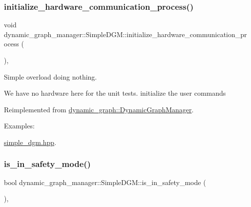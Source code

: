 \subsubsection{\texorpdfstring{initialize\+\_\+hardware\+\_\+communication\+\_\+process()}{initialize\_hardware\_communication\_process()}}
{\footnotesize\ttfamily void dynamic\+\_\+graph\+\_\+manager\+::\+Simple\+D\+G\+M\+::initialize\+\_\+hardware\+\_\+communication\+\_\+process (\begin{DoxyParamCaption}{ }\end{DoxyParamCaption})\hspace{0.3cm}{\ttfamily [inline]}, {\ttfamily [virtual]}}



Simple overload doing nothing. 

We have no hardware here for the unit tests. initialize the user commands 

Reimplemented from \hyperlink{classdynamic__graph_1_1DynamicGraphManager_ae3927887762c52c7bf50ab5a565c3077}{dynamic\+\_\+graph\+::\+Dynamic\+Graph\+Manager}.

\begin{Desc}
\item[Examples\+: ]\par
\hyperlink{simple_dgm_8hpp-example}{simple\+\_\+dgm.\+hpp}.\end{Desc}
\mbox{\label{classdynamic__graph__manager_1_1SimpleDGM_a5fe81f9feb5d982761d7a427aa31e7b4}} 
\subsubsection{\texorpdfstring{is\+\_\+in\+\_\+safety\+\_\+mode()}{is\_in\_safety\_mode()}}
{\footnotesize\ttfamily bool dynamic\+\_\+graph\+\_\+manager\+::\+Simple\+D\+G\+M\+::is\+\_\+in\+\_\+safety\+\_\+mode (\begin{DoxyParamCaption}{ }\end{DoxyParamCaption})\hspace{0.3cm}{\ttfamily [inline]}, {\ttfamily [virtual]}}



